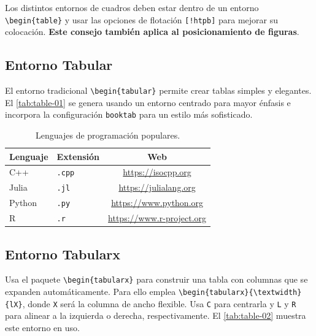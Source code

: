 \begin{consejo}
Los distintos entornos de cuadros deben estar dentro de un entorno \texttt{\textbackslash begin\{table\}} y usar las opciones de flotación \texttt{[!htpb]} para mejorar su colocación. \textbf{Este consejo también aplica al posicionamiento de figuras}.
\end{consejo}

\subsection{Entorno Tabular}

El entorno tradicional \verb|\begin{tabular}| permite crear tablas simples y elegantes. El \autoref{tab:table-01} se genera usando un entorno centrado para mayor énfasis e incorpora la configuración \verb|booktab| para un estilo más sofisticado.

\begin{table}[!htpb]
    \caption{Lenguajes de programación populares.}
    \label{tab:table-01}
    \centering
    \begin{tabular}{llc}
        \toprule
        \textbf{Lenguaje} & \textbf{Extensión} & \textbf{Web} \\ 
        \midrule
        C++          & \texttt{.cpp}   & \url{https://isocpp.org}  \\
        Julia         & \texttt{.jl}    & \url{https://julialang.org}  \\
        Python        & \texttt{.py}    & \url{https://www.python.org}  \\
        R          & \texttt{.r}     & \url{https://www.r-project.org}  \\
        \bottomrule
    \end{tabular}
\end{table}

\subsection{Entorno Tabularx}

Usa el paquete \verb|\begin{tabularx}| para construir una tabla con columnas que se expanden automáticamente. Para ello emplea \verb|\begin{tabularx}{\textwidth}{lX}|, donde \verb|X| será la columna de ancho flexible. Usa \verb|C| para centrarla y \verb|L| y \verb|R| para alinear a la izquierda o derecha, respectivamente. El \autoref{tab:table-02} muestra este entorno en uso.

